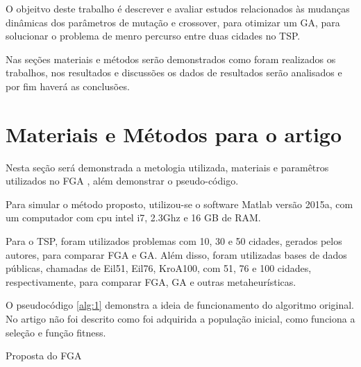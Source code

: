 \documentclass[conference]{IEEEtran}
\begin{document}
O objeitvo deste trabalho é descrever e avaliar estudos relacionados às mudanças dinâmicas dos parâmetros de mutação e crossover, para otimizar um GA, para solucionar o problema de menro percurso entre duas cidades no TSP.

Nas seções materiais e métodos serão demonstrados como foram realizados os trabalhos, nos resultados e discussões os dados de resultados serão analisados e por fim haverá as conclusões. 


\section{Materiais e Métodos para o artigo \cite{fga}}
\label{sec:materials}
Nesta seção será demonstrada a metologia utilizada, materiais e paramêtros utilizados no FGA \cite{fga}, além demonstrar o pseudo-código.

Para simular o método proposto, utilizou-se o software Matlab
versão 2015a, com um computador com cpu intel i7, 2.3Ghz e
16 GB de RAM. 

Para o TSP, foram utilizados problemas com 10, 30 e 50 cidades, gerados pelos autores, para comparar FGA e GA. Além disso, foram utilizadas bases de dados públicas, chamadas de Eil51, Eil76, KroA100, com 51, 76 e 100 cidades, respectivamente, para comparar FGA, GA e outras metaheurísticas.

O pseudocódigo \ref{alg:1} demonstra a ideia de funcionamento do algoritmo original. No artigo não foi descrito como foi adquirida a população inicial, como funciona a seleção e função fitness.

\begin{algorithm}[ht]
\label{alg:1}
\caption{Proposta do FGA}
\label{alg:alg}
\end{algorithm}
\end{document}
